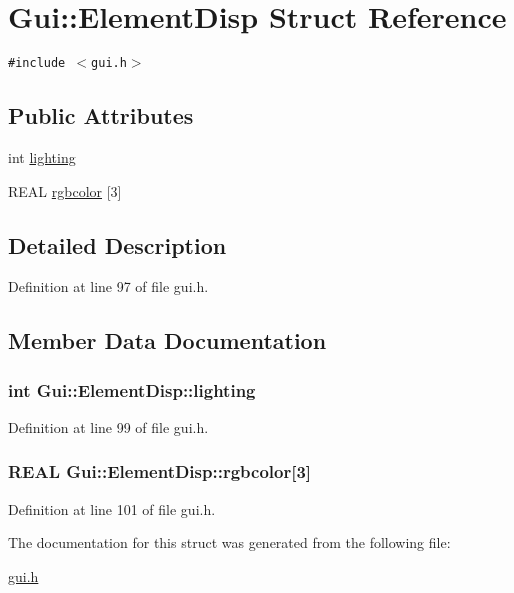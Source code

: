 \hypertarget{structGui_1_1ElementDisp}{
\section{Gui::ElementDisp Struct Reference}
\label{structGui_1_1ElementDisp}
}
{\tt \#include $<$gui.h$>$}

\subsection*{Public Attributes}
\begin{CompactItemize}
\item 
int \hyperlink{structGui_1_1ElementDisp_e0bf734606657dfa2bc3617c7cbb1616}{lighting}
\item 
REAL \hyperlink{structGui_1_1ElementDisp_92e4dad1eab1f1e641cbc5f43dbd6d6d}{rgbcolor} \mbox{[}3\mbox{]}
\end{CompactItemize}


\subsection{Detailed Description}


Definition at line 97 of file gui.h.

\subsection{Member Data Documentation}
\hypertarget{structGui_1_1ElementDisp_e0bf734606657dfa2bc3617c7cbb1616}{
\subsubsection[{lighting}]{\setlength{\rightskip}{0pt plus 5cm}int {\bf Gui::ElementDisp::lighting}}}
\label{structGui_1_1ElementDisp_e0bf734606657dfa2bc3617c7cbb1616}




Definition at line 99 of file gui.h.\hypertarget{structGui_1_1ElementDisp_92e4dad1eab1f1e641cbc5f43dbd6d6d}{
\subsubsection[{rgbcolor}]{\setlength{\rightskip}{0pt plus 5cm}REAL {\bf Gui::ElementDisp::rgbcolor}\mbox{[}3\mbox{]}}}
\label{structGui_1_1ElementDisp_92e4dad1eab1f1e641cbc5f43dbd6d6d}




Definition at line 101 of file gui.h.

The documentation for this struct was generated from the following file:\begin{CompactItemize}
\item 
\hyperlink{gui_8h}{gui.h}\end{CompactItemize}
